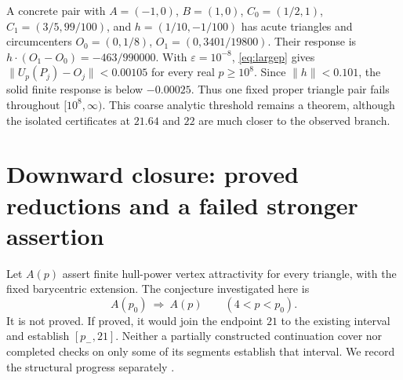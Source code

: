 \documentclass[11pt]{article}
\theoremstyle{definition}
\newcommand{\pn}{p_{-}}
\begin{document}
A concrete pair with $A=(-1,0)$, $B=(1,0)$,
$C_0=(1/2,1)$, $C_1=(3/5,99/100)$, and
$h=(1/10,-1/100)$ has acute triangles and circumcenters
$O_0=(0,1/8)$, $O_1=(0,3401/19800)$. Their response is
$h\cdot(O_1-O_0)=-463/990000$.
With $\varepsilon=10^{-8}$, \eqref{eq:largep} gives
$\|U_p(P_j)-O_j\|<0.00105$ for every real $p\ge10^8$.
Since $\|h\|<0.101$, the solid finite response is below $-0.00025$.
Thus one fixed proper triangle pair fails throughout $[10^8,\infty)$.
This coarse analytic threshold remains a theorem, although the isolated
certificates at $21.64$ and $22$ are much closer to the observed branch.

\section{Downward closure: proved reductions and a failed stronger assertion}
\label{sec:downward}
Let $A(p)$ assert finite hull-power vertex attractivity for every triangle,
with the fixed barycentric extension. The conjecture investigated here is
\begin{equation}\label{eq:downward}
 A(p_0)\ \Longrightarrow\ A(p)\qquad(4<p<p_0).
\end{equation}
It is not proved. If proved, it would join the endpoint $21$ to the
existing interval and establish $[\pn,21]$. Neither a partially constructed
continuation cover nor completed checks on only some of its segments
establish that interval. We record the structural progress separately
\cite{Downward,Projective,Countercheck}.
\end{document}
